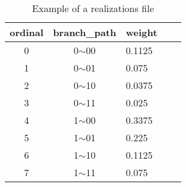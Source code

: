\begin{table}[htbp]
\centering
\begin{tabular}{cclll}

\hline
\rowcolor{lightgray}
\textbf{ordinal} & \textbf{branch\_path} & \textbf{weight} \\
\hline
0 & 0$\sim$00 & 0.1125 \\
1 & 0$\sim$01 & 0.075 \\
2 & 0$\sim$10 & 0.0375 \\
3 & 0$\sim$11 & 0.025 \\
4 & 1$\sim$00 & 0.3375 \\
5 & 1$\sim$01 & 0.225 \\
6 & 1$\sim$10 & 0.1125 \\
7 & 1$\sim$11 & 0.075 \\
\hline

\end{tabular}
\caption{Example of a realizations file}
\label{output:realizations}
\end{table}
